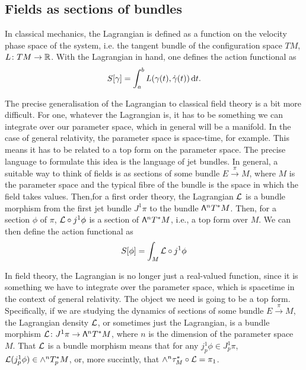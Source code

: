 \documentclass[../main.tex]{subfiles}
\begin{document}
\subsection{Fields as sections of bundles}




In classical mechanics, the Lagrangian is defined as a function on the velocity phase
space of the system, i.e. the tangent bundle of the configuration space \( TM \), \( L
\colon TM \to \mathbb{R} \). With the Lagrangian in hand, one defines the action functional as
\begin{equation*}
	S[\gamma] = \int_a^b L(\gamma(t), \dot{\gamma}(t)) \,\mathrm{d} t. 
\end{equation*}

The precise generalisation of the Lagrangian to classical field theory is a bit more
difficult. For one, whatever the Lagrangian is, it has to be something we can integrate
over our parameter space, which in general will be a manifold. In the case of general
relativity, the parameter space is space-time, for example. This  means it has to be
related to a top form on the parameter space. The precise language to formulate this idea
is the language of jet bundles. In general, a suitable way to think of fields is as
sections of some bundle \( E \xrightarrow{\pi} M \), where \( M \) is the parameter space
and the typical fibre of the bundle is the space in which the field takes values. Then,for
a first order theory, the Lagrangian \( \mathcal{L} \) is a bundle morphism from the first jet bundle \(
J^1\pi \) to the bundle \( \mathsf{\Lambda}^n T^\ast M \). Then, for a section \( \phi \) of \( \pi
\), \( \mathcal{L} \circ j^1 \phi \) is a section of \( \mathsf{\Lambda}^n T^\ast M \), i.e., a top form over
\( M \). We can then define the action functional as
\begin{equation*}
	S[\phi] = \int_M \mathcal{L} \circ j^1 \phi
\end{equation*}



In field theory, the Lagrangian is no longer just a real-valued function, since it is
something we have to integrate over the parameter space, which is spacetime in the context
of general relativity. The object we need is going to be a top form. Specifically, if we
are studying the dynamics of sections of some bundle \( E \xrightarrow{\pi} M \), the
Lagrangian density \( \mathcal{L} \), or sometimes just the Lagrangian, is a bundle morphism \( \mathcal{L}
\colon J^1\pi \to \mathsf{\Lambda}^n T^\ast M \), where \( n \) is the dimension of the parameter
space \( M \). That \( \mathcal{L} \) is a bundle morphism means that for any \( j_p^1 \phi \in
J^1_p \pi \), \( \mathcal{L}(j_p^1 \phi) \in \wedge^n T^\ast_p M \), or, more succintly, that \(
\wedge^n \tau_M^\ast \circ \mathcal{L} = \pi_1 \). 
\end{document}

